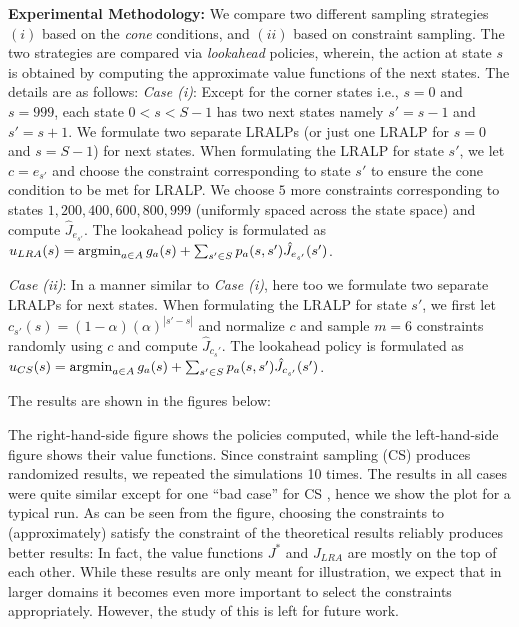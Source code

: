 \textbf{Experimental Methodology:} We compare two different sampling strategies $(i)$ based on the \emph{cone} conditions, and $(ii)$ based on constraint sampling. The two strategies are compared via  \emph{lookahead} policies, wherein, the action at state $s$ is obtained by computing the approximate value functions of the next states. The details are as follows:
\emph{Case (i)}: Except for the corner states i.e., $s=0$ and $s=999$, each state $0<s<S-1$ has two next states namely $s'=s-1$ and $s'=s+1$. We formulate two separate LRALPs (or just one LRALP for $s=0$ and $s=S-1$) for next states. When formulating the LRALP for state $s'$, we let $c=e_{s'}$ and choose the constraint corresponding to state $s'$ to ensure the cone condition to be met for LRALP. We choose $5$ more constraints corresponding to states $1,200,400,600,800,999$ (uniformly spaced across the state space) and compute $\hat{J}_{e_{s'}}$. The lookahead policy is formulated as
$u_{LRA}(s)=\operatorname{argmin}_{a\in A} g_a(s)+\sum_{s'\in S}p_a(s,s')\hat{J}_{e_{s'}}(s')$.

\emph{Case (ii)}: In a manner similar to \emph{Case (i)}, here too we formulate two separate LRALPs for next states. When formulating the LRALP for state $s'$, we first let $c_{s'}(s)=(1-\alpha)(\alpha)^{|s'-s|}$ and normalize $c$ and sample $m=6$ constraints randomly using $c$ and compute $\hat{J}_{c_s'}$. 
The lookahead policy is formulated as 
$u_{CS}(s)=\operatorname{argmin}_{a\in A} g_a(s)+\sum_{s'\in S}p_a(s,s')\hat{J}_{c_{s'}}(s')$.

The results are shown in the figures below:

The right-hand-side figure shows the policies computed, 
while the left-hand-side figure shows their value functions. 
Since constraint sampling (CS) produces randomized results,
we repeated the simulations 10 times. 
The results in all cases were quite similar except for one ``bad case'' for CS , hence we show the plot for a typical run.
As can be seen from the figure, choosing the constraints to (approximately) satisfy the constraint of the theoretical results
reliably produces better results: In fact, the value functions $J^*$ and $J_{LRA}$ are mostly on the top of each other.
While these results are only meant for illustration,
we expect that in larger domains it becomes even more important to select the constraints appropriately.
However, the study of this is left for future work.

